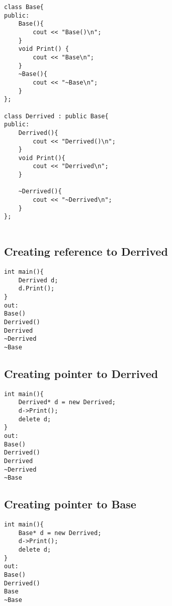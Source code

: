 \documentclass{article}
\begin{document}
\begin{multicols}{2}
\Large
\begin{verbatim}
class Base{
public:
    Base(){
        cout << "Base()\n";
    }
    void Print() {
        cout << "Base\n";
    }
    ~Base(){
        cout << "~Base\n";
    }
};

class Derrived : public Base{
public:
    Derrived(){
        cout << "Derrived()\n";
    }
    void Print(){
        cout << "Derrived\n";
    }

    ~Derrived(){
        cout << "~Derrived\n";
    }
};


\end{verbatim}
\subsection{Creating reference to Derrived}
\begin{verbatim}
int main(){
    Derrived d;
    d.Print();
}
out:
Base()
Derrived()
Derrived
~Derrived
~Base
\end{verbatim}
\subsection{Creating pointer to Derrived}
\begin{verbatim}
int main(){
    Derrived* d = new Derrived;
    d->Print();
    delete d;
}
out:
Base()
Derrived()
Derrived
~Derrived
~Base
\end{verbatim}
\subsection{Creating pointer to Base}
\begin{verbatim}
int main(){
    Base* d = new Derrived;
    d->Print();
    delete d;
}
out:
Base()
Derrived()
Base
~Base
\end{verbatim}
\end{multicols}
\end{document}
